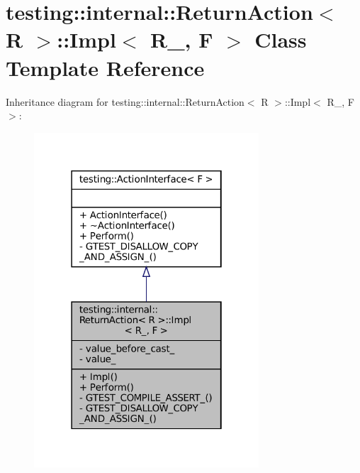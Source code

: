 \hypertarget{classtesting_1_1internal_1_1ReturnAction_1_1Impl}{}\section{testing\+:\+:internal\+:\+:Return\+Action$<$ R $>$\+:\+:Impl$<$ R\+\_\+, F $>$ Class Template Reference}
\label{classtesting_1_1internal_1_1ReturnAction_1_1Impl}


Inheritance diagram for testing\+:\+:internal\+:\+:Return\+Action$<$ R $>$\+:\+:Impl$<$ R\+\_\+, F $>$\+:
\nopagebreak
\begin{figure}[H]
\begin{center}
\leavevmode
\includegraphics[width=238pt]{classtesting_1_1internal_1_1ReturnAction_1_1Impl__inherit__graph}
\end{center}
\end{figure}


